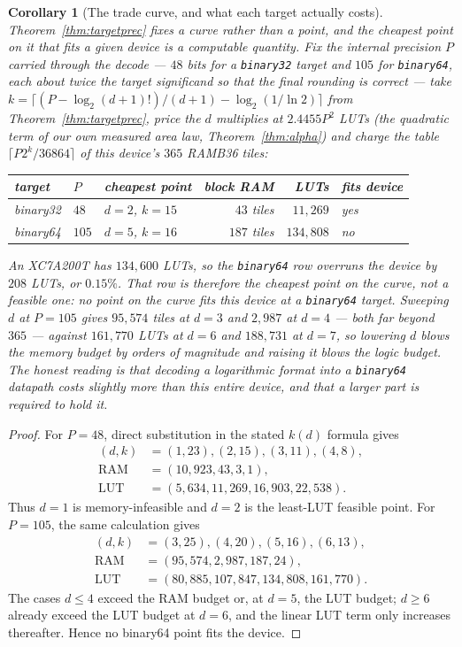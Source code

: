 \documentclass[11pt]{article}
\newtheorem{corollary}{Corollary}
\theoremstyle{definition}
\begin{document}
\begin{corollary}[The trade curve, and what each target actually costs]
\label{cor:tradecurve}
Theorem~\ref{thm:targetprec} fixes a curve rather than a point, and the cheapest
point on it that fits a given device is a computable quantity. Fix the internal
precision $P$ carried through the decode --- $48$ bits for a \texttt{binary32}
target and $105$ for \texttt{binary64}, each about twice the target significand so
that the final rounding is correct --- take $k = \lceil (P - \log_2 (d+1)!)/(d+1) -
\log_2(1/\ln 2)\rceil$ from Theorem~\ref{thm:targetprec}, price the $d$ multiplies
at $2.4455 P^{2}$ LUTs (the quadratic term of our own measured area law,
Theorem~\ref{thm:alpha}) and charge the table $\lceil P 2^{k}/36864\rceil$ of this
device's $365$ RAMB36 tiles:
\begin{center}
\begin{tabular}{lllrrl}
\toprule
target & $P$ & cheapest point & block RAM & LUTs & fits device \\
\midrule
binary32 & $48$ & $d = 2$, $k = 15$ & $43$ tiles & $11{,}269$ & yes \\
binary64 & $105$ & $d = 5$, $k = 16$ & $187$ tiles & $134{,}808$ & no \\
\bottomrule
\end{tabular}
\end{center}
An XC7A200T has $134{,}600$ LUTs, so the \texttt{binary64} row overruns the device
by $208$ LUTs, or $0.15\%$. That row is therefore the cheapest point on the curve,
not a feasible one: no point on the curve fits this device at a
\texttt{binary64} target. Sweeping $d$ at $P = 105$ gives $95{,}574$ tiles at
$d=3$ and $2{,}987$ at $d=4$ --- both far beyond $365$ --- against $161{,}770$ LUTs
at $d=6$ and $188{,}731$ at $d=7$, so lowering $d$ blows the memory budget by
orders of magnitude and raising it blows the logic budget. The honest reading is
that decoding a logarithmic format into a \texttt{binary64} datapath costs slightly
more than this entire device, and that a larger part is required to hold it.
\end{corollary}
\begin{proof}
For $P=48$, direct substitution in the stated $k(d)$ formula gives
\[
\begin{aligned}
(d,k)&=(1,23),(2,15),(3,11),(4,8),\\
\mathrm{RAM}&=(10{,}923,43,3,1),\\
\mathrm{LUT}&=(5{,}634,11{,}269,16{,}903,22{,}538).
\end{aligned}
\]
Thus $d=1$ is memory-infeasible and $d=2$ is the least-LUT feasible point.
For $P=105$, the same calculation gives
\[
\begin{aligned}
(d,k)&=(3,25),(4,20),(5,16),(6,13),\\
\mathrm{RAM}&=(95{,}574,2{,}987,187,24),\\
\mathrm{LUT}&=(80{,}885,107{,}847,134{,}808,161{,}770).
\end{aligned}
\]
The cases $d\leq4$ exceed the RAM budget or, at $d=5$, the LUT budget;
$d\geq6$ already exceed the LUT budget at $d=6$, and the linear LUT term
only increases thereafter. Hence no binary64 point fits the device.
\end{proof}
\end{document}

